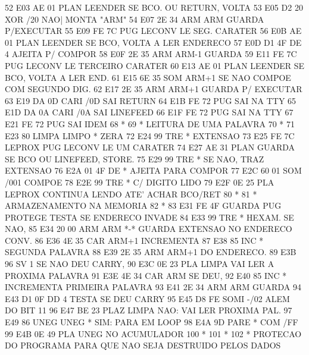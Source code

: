 \documentclass[a4paper,12pt]{article}
\begin{document}
{  52  E03 AE 01          PLAN    LEENDER SE BCO. OU RETURN, VOLTA
  53  E05 D2 20          XOR     /20     NAO| MONTA "ARM"
  54  E07 2E 34          ARM     ARM     GUARDA P/EXECUTAR
  55  E09 FE 7C          PUG     LECONV  LE SEG. CARATER
  56  E0B AE 01          PLAN    LEENDER SE BCO, VOLTA A LER ENDERECO
  57  E0D D1 4F          DE      4       AJEITA P/ COMPOR
  58  E0F 2E 35          ARM     ARM-1   GUARDA
  59  E11 FE 7C          PUG     LECONV  LE TERCEIRO CARATER
  60  E13 AE 01          PLAN    LEENDER SE BCO, VOLTA A LER END.
  61  E15 6E 35          SOM     ARM+1   SE NAO COMPOE COM SEGUNDO DIG.
  62  E17 2E 35          ARM     ARM+1   GUARDA P/ EXECUTAR
  63  E19 DA 0D          CARI    /0D     SAI RETURN
  64  E1B FE 72          PUG     SAI     NA TTY
  65  E1D DA 0A          CARI    /0A     SAI LINEFEED
  66  E1F FE 72          PUG     SAI     NA TTY
  67  E21 FE 72          PUG     SAI     IDEM
  68  *
  69  * LEITURA DE UMA PALAVRA
  70  *
  71  E23 80     LIMPA   LIMPO   *       ZERA
  72  E24 99             TRE     *       EXTENSAO
  73  E25 FE 7C  LEPROX  PUG     LECONV  LE UM CARATER
  74  E27 AE 31          PLAN    GUARDA  SE BCO OU LINEFEED, STORE.
  75  E29 99             TRE     *       SE NAO, TRAZ EXTENSAO
  76  E2A 01 4F          DE      *       AJEITA PARA COMPOR
  77  E2C 60 01          SOM     /001    COMPOE
  78  E2E 99             TRE     *       C/ DIGITO LIDO
  79  E2F 0E 25          PLA     LEPROX  CONTINUA LENDO ATE' ACHAR BCO/RET
  80  *
  81  * ARMAZENAMENTO NA MEMORIA
  82  *
  83  E31 FE 4F  GUARDA  PUG     PROTEGE TESTA SE ENDERECO INVADE
  84  E33 99             TRE     *       HEXAM. SE NAO,
  85  E34 20 00  ARM     ARM     *-*     GUARDA EXTENSAO NO ENDERECO CONV.
  86  E36 4E 35          CAR     ARM+1   INCREMENTA
  87  E38 85             INC     *       SEGUNDA PALAVRA
  88  E39 2E 35          ARM     ARM+1   DO ENDERECO.
  89  E3B 96             SV      1       SE NAO DEU CARRY,
  90  E3C 0E 23          PLA     LIMPA   VAI LER A PROXIMA PALAVRA
  91  E3E 4E 34          CAR     ARM     SE DEU,
  92  E40 85             INC     *       INCREMENTA PRIMEIRA PALAVRA
  93  E41 2E 34          ARM     ARM     GUARDA
  94  E43 D1 0F          DD      4       TESTA SE DEU CARRY
  95  E45 D8 FE          SOMI    -/02    ALEM DO BIT 11
  96  E47 BE 23          PLAZ    LIMPA   NAO: VAI LER PROXIMA PAL.
  97  E49 86     UNEG    UNEG    *       SIM: PARA EM LOOP
  98  E4A 9D             PARE    *       COM /FF
  99  E4B 0E 49          PLA     UNEG    NO ACUMULADOR
 100  *
 101  *
 102  * PROTECAO DO PROGRAMA PARA QUE NAO SEJA DESTRUIDO PELOS DADOS
}
\end{document}
